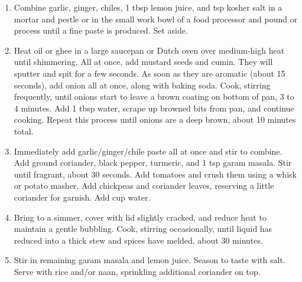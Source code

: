 \begin{enumerate}
    \item Combine garlic, ginger, chiles, 1 tbsp lemon juice, and  tsp kosher salt in a mortar and pestle or in the small work bowl of a food processor and pound or process until a fine paste is produced. Set aside.
    \item Heat oil or ghee in a large saucepan or Dutch oven over medium-high heat until shimmering. All at once, add mustard seeds and cumin. They will sputter and spit for a few seconds. As soon as they are aromatic (about 15 seconds), add onion all at once, along with baking soda. Cook, stirring frequently, until onions start to leave a brown coating on bottom of pan, 3 to 4 minutes. Add 1 tbsp water, scrape up browned bits from pan, and continue cooking. Repeat this process until onions are a deep brown, about 10 minutes total.
    \item Immediately add garlic/ginger/chile paste all at once and stir to combine. Add ground coriander, black pepper, turmeric, and 1 tsp garam masala. Stir until fragrant, about 30 seconds. Add tomatoes and crush them using a whisk or potato masher. Add chickpeas and coriander leaves, reserving a little coriander for garnish. Add  cup water.
    \item Bring to a simmer, cover with lid slightly cracked, and reduce heat to maintain a gentle bubbling. Cook, stirring occasionally, until liquid has reduced into a thick stew and spices have melded, about 30 minutes.
    \item Stir in remaining garam masala and lemon juice. Season to taste with salt. Serve with rice and/or naan, sprinkling additional coriander on top.
\end{enumerate}

